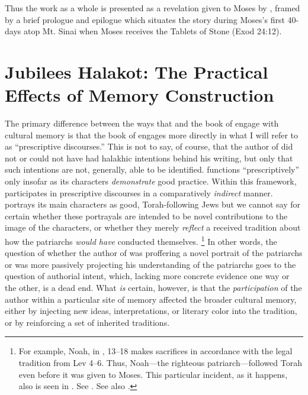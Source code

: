 Thus the work as a whole is presented as a revelation given to Moses by \yahweh, framed by a brief prologue and epilogue which situates the story during Moses's first 40-days atop Mt. Sinai when Moses receives the Tablets of Stone (Exod 24:12).\autocite[1:129]{vanderkam2018}


\section{Jubilees Halakot: The Practical Effects of Memory Construction}

The primary difference between the ways that \ga and the book of \jub engage with cultural memory is that the book of \jub engages more directly in what I will refer to as ``prescriptive discourses.'' This is not to say, of course, that the author of \ga did not or could not have had halakhic intentions behind his writing, but only that such intentions are not, generally, able to be identified. \GA functions ``prescriptively'' only insofar as its characters \emph{demonstrate} good practice. Within this framework, \ga participates in prescriptive discourses in a comparatively \emph{indirect} manner. \GA portrays its main characters as good, Torah-following Jews but we cannot say for certain whether these portrayals are intended to be novel contributions to the image of the characters, or whether they merely \emph{reflect} a received tradition about how the patriarchs \emph{would have} conducted themselves.%
    \footnote{For example, Noah, in , 13--18 makes sacrifices in accordance with the legal tradition from Lev 4--6. Thus, Noah---the righteous patriarch---followed Torah even before it was given to Moses. This particular incident, as it happens, also is seen in \jub. See \cite[112]{crawford2008}. See also \cite[419]{reeves_revq1986}.}
In other words, the question of whether the author of \ga was proffering a novel portrait of the patriarchs or was more passively projecting his understanding of the patriarchs goes to the question of authorial intent, which, lacking more concrete evidence one way or the other, is a dead end. What \emph{is} certain, however, is that the \emph{participation} of the author within a particular site of memory affected the broader cultural memory, either by injecting new ideas, interpretations, or literary color into the tradition, or by reinforcing a set of inherited traditions.


